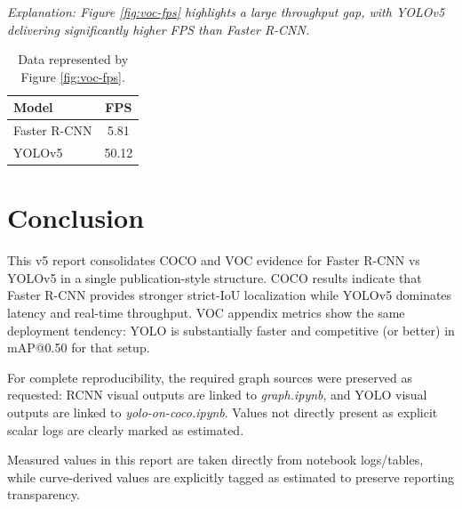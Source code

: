 \documentclass[conference]{IEEEtran}
\begin{document}
\noindent\footnotesize\textit{Explanation: Figure \ref{fig:voc-fps} highlights a large throughput gap, with YOLOv5 delivering significantly higher FPS than Faster R-CNN.}\normalsize

\begin{table}[!htbp]
\centering
\caption{Data represented by Figure \ref{fig:voc-fps}.}
\label{tab:fig-voc-fps}
\begin{tabular}{lc}
\toprule
\textbf{Model} & \textbf{FPS} \\
\midrule
Faster R-CNN & 5.81 \\
YOLOv5 & 50.12 \\
\bottomrule
\end{tabular}
\end{table}

\section{Conclusion}
This v5 report consolidates COCO and VOC evidence for Faster R-CNN vs YOLOv5 in a single publication-style structure. COCO results indicate that Faster R-CNN provides stronger strict-IoU localization while YOLOv5 dominates latency and real-time throughput. VOC appendix metrics show the same deployment tendency: YOLO is substantially faster and competitive (or better) in mAP@0.50 for that setup.

For complete reproducibility, the required graph sources were preserved as requested: RCNN visual outputs are linked to \textit{graph.ipynb}, and YOLO visual outputs are linked to \textit{yolo-on-coco.ipynb}. Values not directly present as explicit scalar logs are clearly marked as estimated.

Measured values in this report are taken directly from notebook logs/tables, while curve-derived values are explicitly tagged as estimated to preserve reporting transparency.

\FloatBarrier
\clearpage
\end{document}
